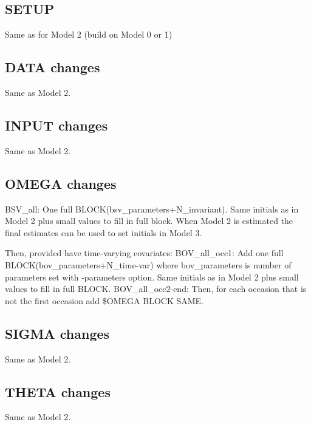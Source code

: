 \subsection{SETUP}
Same as for Model 2 (build on Model 0 or 1)

\subsection{DATA changes}
Same as Model 2.
\subsection{INPUT changes}
Same as Model 2.

\subsection{OMEGA changes}
BSV\_all: One full BLOCK(bsv\_parameters+N\_invariant).
Same initials as in Model 2 plus small values to fill in full block. When Model 2 is estimated
the final estimates can be used to set initials in Model 3.

Then, provided have time-varying covariates:
BOV\_all\_occ1: Add one full BLOCK(bov\_parameters+N\_time-var) where bov\_parameters is number of parameters set with -parameters option.
Same initials as in Model 2 plus small values to fill in full BLOCK.
BOV\_all\_occ2-end: Then, for each occasion that is not the first occasion add \$OMEGA BLOCK SAME.

\subsection{SIGMA changes}
Same as Model 2.

\subsection{THETA changes}
Same as Model 2.

